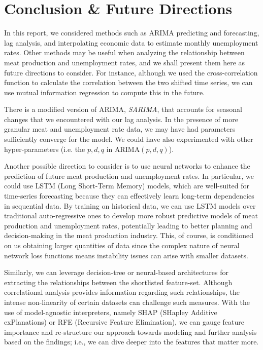 \documentclass[12pt]{article}
\begin{document}
\section{Conclusion \& Future Directions}
In this report, we considered methods such as ARIMA predicting and forecasting, lag analysis, and interpolating economic data to estimate monthly unemployment rates. Other methods may be useful when analyzing the relationship between meat production and unemployment rates, and we shall present them here as future directions to consider. For instance, although we used the cross-correlation function to calculate the correlation between the two shifted time series, we can use mutual information regression to compute this in the future. 

There is a modified version of ARIMA, \textit{SARIMA}, that accounts for seasonal changes that we encountered with our lag analysis. In the presence of more granular meat and unemployment rate data, we may have had parameters sufficiently converge for the model. We could have also experimented with other hyper-parameters (i.e. the $p,d,q$ in $\mathrm{ARIMA}(p,d,q)$).

Another possible direction to consider is to use neural networks to enhance the prediction of future meat production and unemployment rates. In particular, we could use LSTM (Long Short-Term Memory) models, which are well-suited for time-series forecasting because they can effectively learn long-term dependencies in sequential data. By training on historical data, we can use LSTM models over traditional auto-regressive ones to develop more robust predictive models of meat production and unemployment rates, potentially leading to better planning and decision-making in the meat production industry. This, of course, is conditioned on us obtaining larger quantities of data since the complex nature of neural network loss functions means instability issues can arise with smaller datasets.

Similarly, we can leverage decision-tree or neural-based architectures for extracting the relationships between the shortlisted feature-set. Although correlational analysis provides information regarding such relationships, the intense non-linearity of certain datasets can challenge such measures. With the use of model-agnostic interpreters, namely SHAP (SHapley Additive exPlanations) or RFE (Recursive Feature Elimination), we can gauge feature importance and re-structure our approach towards modeling and further analysis based on the findings; i.e., we can dive deeper into the features that matter more.

\clearpage
 

\end{document}
